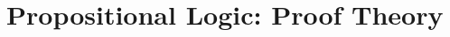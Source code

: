 \documentclass[a4paper, 11pt]{article} %
\begin{document}






\section*{\sc Propositional Logic: Proof Theory}
\end{document}
